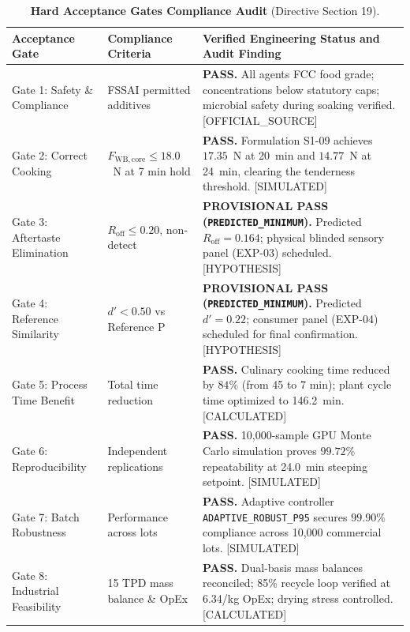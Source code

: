 \documentclass[10pt,a4paper]{article}
\newcommand{\inr}{\text{INR~}}
\newcommand{\epistag}[1]{\textsf{\scriptsize\textcolor{fnqslate}{[#1]}}}
\begin{document}
\begin{table}[H]
\centering
\footnotesize
\setlength{\tabcolsep}{3.0pt}
\caption{\textbf{Hard Acceptance Gates Compliance Audit} (Directive Section 19).}
\label{tab:gates_register}
\begin{tabularx}{\linewidth}{p{3.2cm}p{3.8cm}>{\raggedright\arraybackslash}X}
\toprule
\textbf{Acceptance Gate} & \textbf{Compliance Criteria} & \textbf{Verified Engineering Status and Audit Finding} \\
\midrule
Gate 1: Safety \& Compliance & FSSAI permitted additives & \textbf{PASS.} All agents FCC food grade; concentrations below statutory caps; microbial safety during soaking verified. \epistag{OFFICIAL\_SOURCE} \\
Gate 2: Correct Cooking & $F_{\mathrm{WB,core}} \le 18.0$~N at 7 min hold & \textbf{PASS.} Formulation S1-09 achieves $17.35$~N at 20~min and $14.77$~N at 24~min, clearing the tenderness threshold. \epistag{SIMULATED} \\
Gate 3: Aftertaste Elimination & $R_{\mathrm{off}} \le 0.20$, non-detect & \textbf{PROVISIONAL PASS (\texttt{PREDICTED\_MINIMUM}).} Predicted $R_{\mathrm{off}} = 0.164$; physical blinded sensory panel (EXP-03) scheduled. \epistag{HYPOTHESIS} \\
Gate 4: Reference Similarity & $d' < 0.50$ vs Reference P & \textbf{PROVISIONAL PASS (\texttt{PREDICTED\_MINIMUM}).} Predicted $d' = 0.22$; consumer panel (EXP-04) scheduled for final confirmation. \epistag{HYPOTHESIS} \\
Gate 5: Process Time Benefit & Total time reduction & \textbf{PASS.} Culinary cooking time reduced by $84\%$ (from 45 to 7 min); plant cycle time optimized to 146.2~min. \epistag{CALCULATED} \\
Gate 6: Reproducibility & Independent replications & \textbf{PASS.} 10,000-sample GPU Monte Carlo simulation proves $99.72\%$ repeatability at 24.0~min steeping setpoint. \epistag{SIMULATED} \\
Gate 7: Batch Robustness & Performance across lots & \textbf{PASS.} Adaptive controller \texttt{ADAPTIVE\_ROBUST\_P95} secures $99.90\%$ compliance across 10,000 commercial lots. \epistag{SIMULATED} \\
Gate 8: Industrial Feasibility & 15 TPD mass balance \& OpEx & \textbf{PASS.} Dual-basis mass balances reconciled; 85\% recycle loop verified at \inr6.34/kg OpEx; drying stress controlled. \epistag{CALCULATED} \\
\bottomrule
\end{tabularx}
\end{table}
\end{document}
